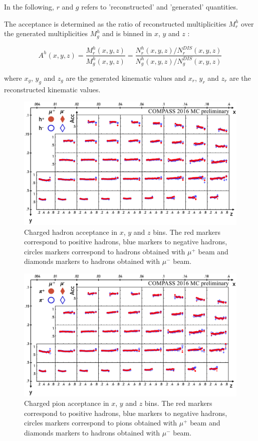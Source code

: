 \documentclass[letterpaper,12pt]{article}
\begin{document}
In the following, $r$ and $g$ refers to 'reconstructed' and 'generated' quantities.

The acceptance is determined as the ratio of reconstructed multiplicities $M^h_r$ over the generated multiplicities $M^h_g$
and is binned in $x$, $y$ and $z$ :

\begin{equation}
  A^h(x,y,z) = \frac{M^h_r(x,y,z)}{M^h_g(x,y,z)}=\frac{N^h_r(x,y,z)/N^{DIS}_r(x,y,z)}{N^h_g(x,y,z)/N^{DIS}_g(x,y,z)}
\end{equation}

where $x_g$, $y_g$ and $z_g$ are the generated kinematic values and $x_r$, $y_r$ and $z_r$ are the reconstructed kinematic
values.

\begin{figure}
	\includegraphics[scale=0.5]{./gfx/AccH.png}
	\caption{Charged hadron acceptance in $x$, $y$ and $z$ bins. The red markers correspond to positive hadrons, blue markers to negative hadrons, circles markers correspond to hadrons obtained with $\mu^+$ beam and diamonds markers to hadrons obtained with $\mu^-$ beam.}
	\label{AccH}
\end{figure}

\begin{figure}
	\includegraphics[scale=0.5]{./gfx/AccPi.png}
	\caption{Charged pion acceptance in $x$, $y$ and $z$ bins. The red markers correspond to positive hadrons, blue markers to negative hadrons, circles markers correspond to pions obtained with $\mu^+$ beam and diamonds markers to hadrons obtained with $\mu^-$ beam.}
	\label{AccPi}
\end{figure}
\end{document}
